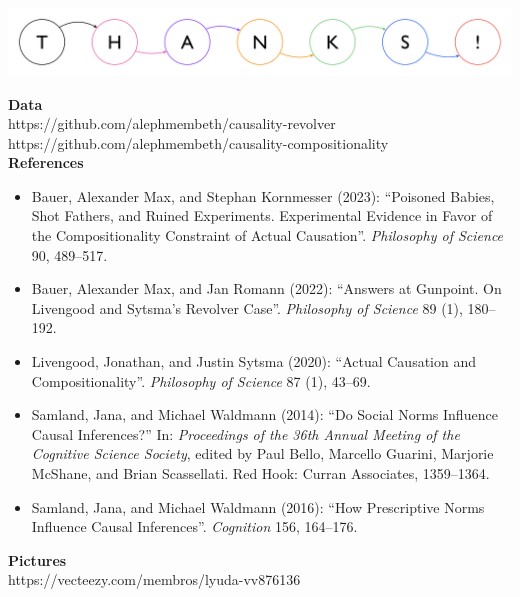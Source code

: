 \documentclass[xcolor=table,9pt,aspectratio=169]{beamer}
\begin{document}
\begin{frame}{}
\begin{center}
   {\includegraphics[width=0.9\linewidth]{figures/thanks.pdf}}
\end{center}
{\footnotesize
\textbf{Data}\\
https://github.com/alephmembeth/causality-revolver\\
https://github.com/alephmembeth/causality-compositionality\\
\vspace{0.5em}
\textbf{References}\\
\vspace{-0.5em}
\begin{itemize}[label=,leftmargin=2em,itemindent=-2em]
   \item Bauer, Alexander Max, and Stephan Kornmesser (2023): ``Poisoned Babies, Shot Fathers, and Ruined Experiments. Experimental Evidence in Favor of the Compositionality Constraint of Actual Causation''. \textit{Philosophy of Science} 90, 489--517.
   \item Bauer, Alexander Max, and Jan Romann (2022): ``Answers at Gunpoint. On Livengood and Sytsma's Revolver Case''. \textit{Philosophy of Science} 89 (1), 180--192.
   \item Livengood, Jonathan, and Justin Sytsma (2020): ``Actual Causation and Compositionality''. \textit{Philosophy of Science} 87 (1), 43--69.
   \item Samland, Jana, and Michael Waldmann (2014): ``Do Social Norms Influence Causal Inferences?'' In: \textit{Proceedings of the 36th Annual Meeting of the Cognitive Science Society}, edited by Paul Bello, Marcello Guarini, Marjorie McShane, and Brian Scassellati. Red Hook: Curran Associates, 1359--1364.
   \item Samland, Jana, and Michael Waldmann (2016): ``How Prescriptive Norms Influence Causal Inferences''. \textit{Cognition} 156, 164--176.
\end{itemize}
\textbf{Pictures}\\
https://vecteezy.com/membros/lyuda-vv876136\\
}
\end{frame}
\end{document}
